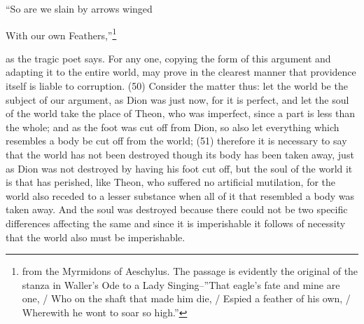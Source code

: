``So are we slain by arrows winged

With our own Feathers,''\footnote{from the Myrmidons of Aeschylus. The passage is evidently the original of the stanza in
Waller's Ode to a Lady Singing--''That eagle's fate and mine are one, / Who on the shaft that made him die, / Espied a
feather of his own, / Wherewith he wont to soar so high.''}

as the tragic poet says. For any one, copying the form of this argument and adapting it to the entire
world, may prove in the clearest manner that providence itself is liable to corruption. (50) Consider
the matter thus: let the world be the subject of our argument, as Dion was just now, for it is perfect,
and let the soul of the world take the place of Theon, who was imperfect, since a part is less than
the whole; and as the foot was cut off from Dion, so also let everything which resembles a body be
cut off from the world; (51) therefore it is necessary to say that the world has not been destroyed
though its body has been taken away, just as Dion was not destroyed by having his foot cut off, but
the soul of the world it is that has perished, like Theon, who suffered no artificial mutilation, for the
world also receded to a lesser substance when all of it that resembled a body was taken away. And
the soul was destroyed because there could not be two specific differences affecting the same
and since it is imperishable it follows of necessity that the world also must be imperishable.

